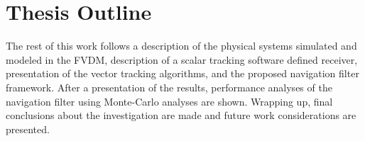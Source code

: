 \section{Thesis Outline}
The rest of this work follows a description of the physical systems simulated and modeled in the FVDM, description of a scalar tracking software defined receiver, presentation of the vector tracking algorithms, and the proposed navigation filter framework. After a presentation of the results, performance analyses of the navigation filter using Monte-Carlo analyses are shown. Wrapping up, final conclusions about the investigation are made and future work considerations are presented.